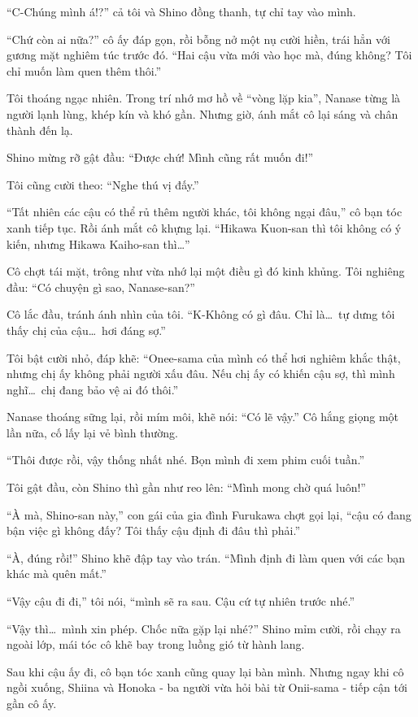 \documentclass[../main.tex]{subfiles}
\begin{document}
``C-Chúng mình á!?'' cả tôi và Shino đồng thanh, tự chỉ tay vào mình.

``Chứ còn ai nữa?'' cô ấy đáp gọn, rồi bỗng nở một nụ cười hiền, trái hẳn với gương mặt nghiêm túc trước đó. ``Hai cậu vừa mới vào học mà, đúng không? Tôi chỉ muốn làm quen thêm thôi.''

Tôi thoáng ngạc nhiên. Trong trí nhớ mơ hồ về ``vòng lặp kia'', Nanase từng là người lạnh lùng, khép kín và khó gần. Nhưng giờ, ánh mắt cô lại sáng và chân thành đến lạ.

Shino mừng rỡ gật đầu: ``Được chứ! Mình cũng rất muốn đi!''

Tôi cũng cười theo: ``Nghe thú vị đấy.''

``Tất nhiên các cậu có thể rủ thêm người khác, tôi không ngại đâu,'' cô bạn tóc xanh tiếp tục. Rồi ánh mắt cô khựng lại. ``Hikawa Kuon-san thì tôi không có ý kiến, nhưng Hikawa Kaiho-san thì\dots''

Cô chợt tái mặt, trông như vừa nhớ lại một điều gì đó kinh khủng. Tôi nghiêng đầu: ``Có chuyện gì sao, Nanase-san?''

Cô lắc đầu, tránh ánh nhìn của tôi. ``K-Không có gì đâu. Chỉ là\dots\ tự dưng tôi thấy chị của cậu\dots\ hơi đáng sợ.''

Tôi bật cười nhỏ, đáp khẽ: ``Onee-sama của mình có thể hơi nghiêm khắc thật, nhưng chị ấy không phải người xấu đâu. Nếu chị ấy có khiến cậu sợ, thì mình nghĩ\dots\ chị đang bảo vệ ai đó thôi.''

Nanase thoáng sững lại, rồi mím môi, khẽ nói: ``Có lẽ vậy.'' Cô hắng giọng một lần nữa, cố lấy lại vẻ bình thường.

``Thôi được rồi, vậy thống nhất nhé. Bọn mình đi xem phim cuối tuần.''

Tôi gật đầu, còn Shino thì gần như reo lên: ``Mình mong chờ quá luôn!''

``À mà, Shino-san này,'' con gái của gia đình Furukawa chợt gọi lại, ``cậu có đang bận việc gì không đấy? Tôi thấy cậu định đi đâu thì phải.''

``À, đúng rồi!'' Shino khẽ đập tay vào trán. ``Mình định đi làm quen với các bạn khác mà quên mất.''

``Vậy cậu đi đi,'' tôi nói, ``mình sẽ ra sau. Cậu cứ tự nhiên trước nhé.''

``Vậy thì\dots\ mình xin phép. Chốc nữa gặp lại nhé?'' Shino mỉm cười, rồi chạy ra ngoài lớp, mái tóc cô khẽ bay trong luồng gió từ hành lang.

Sau khi cậu ấy đi, cô bạn tóc xanh cũng quay lại bàn mình. Nhưng ngay khi cô ngồi xuống, Shiina và Honoka - ba người vừa hỏi bài từ Onii-sama - tiếp cận tới gần cô ấy.
\end{document}
